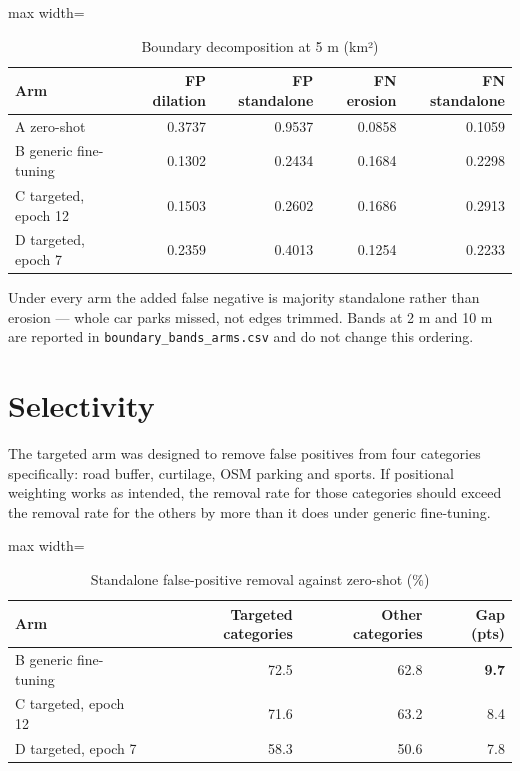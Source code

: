\begin{table}[htbp]
\centering
\caption{Boundary decomposition at 5 m (km²)}\label{tab:C.3}
\begin{adjustbox}{max width=\textwidth}
\begin{tabular}{@{}lrrrr@{}}
\toprule
Arm & FP dilation & FP standalone & FN erosion & FN standalone \\
\midrule
A zero-shot & 0.3737 & 0.9537 & 0.0858 & 0.1059 \\
B generic fine-tuning & 0.1302 & 0.2434 & 0.1684 & 0.2298 \\
C targeted, epoch 12 & 0.1503 & 0.2602 & 0.1686 & 0.2913 \\
D targeted, epoch 7 & 0.2359 & 0.4013 & 0.1254 & 0.2233 \\
\bottomrule
\end{tabular}
\end{adjustbox}
\end{table}
\restoreparskip

Under every arm the added false negative is majority standalone rather than erosion --- whole car parks missed, not edges trimmed. Bands at 2 m and 10 m are reported in \texttt{boundary\_\allowbreak{}bands\_\allowbreak{}arms.\allowbreak{}csv} and do not change this ordering.

\hypertarget{selectivity}{%
\section{Selectivity}\label{selectivity}}

The targeted arm was designed to remove false positives from four categories specifically: road buffer, curtilage, OSM parking and sports. If positional weighting works as intended, the removal rate for those categories should exceed the removal rate for the others by more than it does under generic fine-tuning.

\begin{table}[htbp]
\centering
\caption{Standalone false-positive removal against zero-shot (\%)}\label{tab:C.4}
\begin{adjustbox}{max width=\textwidth}
\begin{tabular}{@{}lrrr@{}}
\toprule
Arm & Targeted categories & Other categories & Gap (pts) \\
\midrule
B generic fine-tuning & 72.5 & 62.8 & \textbf{9.7} \\
C targeted, epoch 12 & 71.6 & 63.2 & 8.4 \\
D targeted, epoch 7 & 58.3 & 50.6 & 7.8 \\
\bottomrule
\end{tabular}
\end{adjustbox}
\end{table}
\restoreparskip

